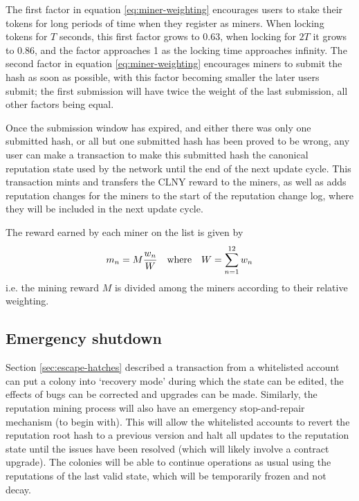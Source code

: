 The first factor in equation \eqref{eq:miner-weighting} encourages users to stake their tokens for long periods of time when they register as miners. When locking tokens for $T$ seconds, this first factor grows to 0.63, when locking for $2T$ it grows to 0.86, and the factor approaches 1 as the locking time approaches infinity. The second factor in equation \eqref{eq:miner-weighting} encourages miners to submit the hash as soon as possible, with this factor becoming smaller the later users submit; the first submission will have twice the weight of the last submission, all other factors being equal.

Once the submission window has expired, and either there was only one submitted hash, or all but one submitted hash has been proved to be wrong, any user can make a transaction to make this submitted hash the canonical reputation state used by the network until the end of the next update cycle. This transaction mints and transfers the CLNY reward to the miners, as well as adds reputation changes for the miners to the start of the reputation change log, where they will be included in the next update cycle.

The reward earned by each miner on the list is given by
\begin{equation}\label{eq:miner-payout}
 m_n = M \frac{w_n}{W} \quad \textnormal{where} \quad W = \sum_{n=1}^{12} w_n
\end{equation}
i.e. the mining reward $M$ is divided among the miners according to their relative weighting.

\subsection{Emergency shutdown}\label{sec:big-red-button}

Section \ref{sec:escape-hatches} described a transaction from a whitelisted account can put a colony into `recovery mode' during which the state can be edited, the effects of bugs can be corrected and upgrades can be made. Similarly, the reputation mining process will also have an emergency stop-and-repair mechanism (to begin with). This will allow the whitelisted accounts to revert the reputation root hash to a previous version and halt all updates to the reputation state until the issues have been resolved (which will likely involve a contract upgrade). The colonies will be able to continue operations as usual using the reputations of the last valid state, which will be temporarily frozen and not decay.
